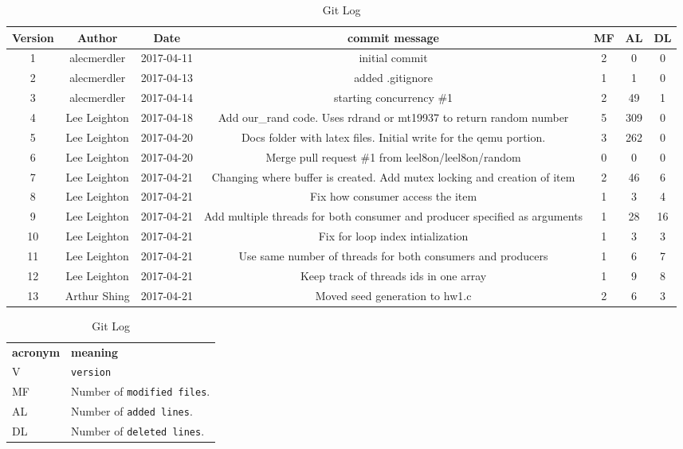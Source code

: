 \documentclass[journal, letterpaper, draftclsnofoot, onecolumn, 10pt]{IEEEtran}
\begin{document}
\FloatBarrier
\begin{table}[h!]
\centering
\caption{Git Log}
\begin{tabular}{|c|c|c|c|c|c|c|}
    \hline \textbf{Version} & \textbf{Author} & \textbf{Date} & \textbf{commit message} & \textbf{MF} & \textbf{AL} & \textbf{DL}  \\
    \hline 1 & alecmerdler & 2017-04-11 & initial commit & 2 & 0 & 0 \\
    \hline 2 & alecmerdler & 2017-04-13 & added .gitignore & 1 & 1 & 0 \\
    \hline 3 & alecmerdler & 2017-04-14 & starting concurrency \#1 & 2 & 49 & 1 \\
    \hline 4 & Lee Leighton & 2017-04-18 & Add our\_rand code. Uses rdrand or mt19937 to return random number & 5 & 309 & 0 \\
    \hline 5 & Lee Leighton & 2017-04-20 & Docs folder with latex files. Initial write for the qemu portion. & 3 & 262 & 0 \\
    \hline 6 & Lee Leighton & 2017-04-20 & Merge pull request \#1 from leel8on/leel8on/random & 0 & 0 & 0 \\
    \hline 7 & Lee Leighton & 2017-04-21 & Changing where buffer is created. Add mutex locking and creation of item & 2 & 46 & 6 \\
    \hline 8 & Lee Leighton & 2017-04-21 & Fix how consumer access the item & 1 & 3 & 4 \\
    \hline 9 & Lee Leighton & 2017-04-21 & Add multiple threads for both consumer and producer specified as arguments & 1 & 28 & 16 \\
    \hline 10 & Lee Leighton & 2017-04-21 & Fix for loop index intialization & 1 & 3 & 3 \\
    \hline 11 & Lee Leighton & 2017-04-21 & Use same number of threads for both consumers and producers & 1 & 6 & 7 \\
    \hline 12 & Lee Leighton & 2017-04-21 & Keep track of threads ids in one array & 1 & 9 & 8 \\
    \hline 13 & Arthur Shing & 2017-04-21 & Moved seed generation to hw1.c & 2 & 6 & 3 \\
    \hline
\end{tabular}
\begin{tabular}{lp{12cm}}
  \label{tabular:legend:git-log}
  \textbf{acronym} & \textbf{meaning} \\
  V & \texttt{version} \\
  MF & Number of \texttt{modified files}. \\
  AL & Number of \texttt{added lines}. \\
  DL & Number of \texttt{deleted lines}. \\
\end{tabular}
\end{table}
\FloatBarrier
\end{document}
